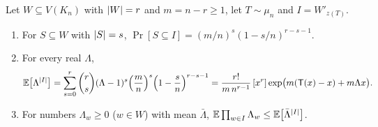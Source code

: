 \begin{lemma}\label{lem:kn-iso}
Let $W\subseteq V(K_n)$ with $\lvert W\rvert=r$ and $m=n-r\ge1$, let $T\sim\mu_n$ and $I=W'_{z(T)}$.
\begin{enumerate}[label=(I\arabic*)]
\item\label{iso:one} For $S\subseteq W$ with $\lvert S\rvert=s$, $\Pr[S\subseteq I]=(m/n)^s(1-s/n)^{r-s-1}$.
\item\label{iso:mgf} For every real $\Lambda$,
\[
  \mathbb{E}\bigl[\Lambda^{\lvert I\rvert}\bigr]=\sum_{s=0}^r\binom rs(\Lambda-1)^s\Bigl(\frac mn\Bigr)^s\Bigl(1-\frac sn\Bigr)^{r-s-1}=\frac{r!}{m\,n^{r-1}}\,[x^r]\exp\bigl(m(\mathsf T(x)-x)+m\Lambda x\bigr).
\]
\item\label{iso:mean} For numbers $\Lambda_w\ge0$ ($w\in W$) with mean $\bar\Lambda$, $\mathbb{E}\prod_{w\in I}\Lambda_w\le\mathbb{E}\bigl[\bar\Lambda^{\lvert I\rvert}\bigr]$.
\end{enumerate}
\end{lemma}

